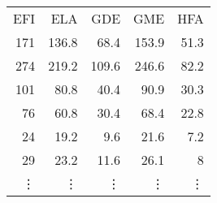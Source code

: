   \begin{tabular}{rrrrr}
EFI & ELA & GDE & GME & HFA \\
  171 &136.8&  68.4& 153.9 &51.3\\
  274 &219.2 &109.6 &246.6 &82.2\\
  101 & 80.8&  40.4 & 90.9& 30.3\\
   76 & 60.8 & 30.4 & 68.4 &22.8\\
   24 & 19.2 &  9.6 & 21.6  &7.2\\
   29 & 23.2 & 11.6&  26.1 & 8 \\
   \vdots & \vdots & \vdots & \vdots & \vdots
\end{tabular}